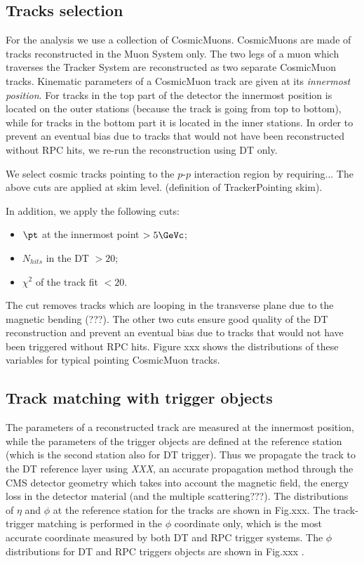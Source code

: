 \subsection{Tracks selection}
For the analysis we use a collection of CosmicMuons.
CosmicMuons are made of tracks reconstructed in the
Muon System only.
The two legs of a muon which traverses
the Tracker System are reconstructed as two separate 
CosmicMuon tracks.
Kinematic parameters of a CosmicMuon track are given 
at its {\em innermost position}. 
For tracks in the top part of the detector
the innermost position is located on the outer stations
(because the track is going from top to bottom),
while for tracks in the bottom part it is located 
in the inner stations.
In order to prevent an eventual bias due to tracks 
that would not have been reconstructed without
RPC hits, we re-run the reconstruction using DT only.

We select cosmic tracks pointing to the $p$-$p$ interaction
region by requiring... 
The above cuts are applied at skim level.
(definition of TrackerPointing skim).

In addition, we apply the following 
cuts:
\begin{itemize}
\item
$\pt$ at the innermost point $ > 5\GeVc$;
\item
$N_{hits}$ in the DT $ > 20 $;
\item
$\chi^2$ of the track fit $ < 20 $.
\end{itemize}
The \pt cut removes tracks which are
looping in the transverse plane due 
to the magnetic bending (???).
The other two cuts ensure good quality
of the DT reconstruction and 
prevent an eventual bias due to 
tracks that would not have been triggered 
without RPC hits.
Figure xxx shows the distributions
of these variables for typical pointing
CosmicMuon tracks.

\subsection{Track matching with trigger objects}
The parameters of a reconstructed track are
measured at the innermost position, while the
parameters of the trigger objects are defined
at the reference station (which is the second station 
also for DT trigger).
Thus we propagate the track to the DT reference layer using 
{\em XXX}, an accurate propagation method through the CMS detector
geometry which takes into account the magnetic field, the 
energy loss in the detector material (and 
the multiple scattering???).
The distributions of $\eta$ and $\phi$ at the reference 
station for the tracks are shown in Fig.xxx. 
The track-trigger matching is performed in the $\phi$ coordinate 
only, which is the most accurate coordinate measured by both 
DT and RPC trigger systems. The $\phi$ distributions for DT and
RPC triggers objects are shown in Fig.xxx .


